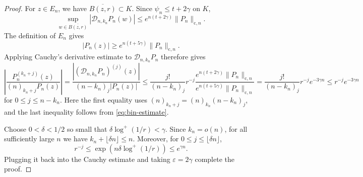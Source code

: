 \documentclass[10pt,reqno]{amsart}
\theoremstyle{remark}
\begin{document}
\begin{proof}
    For $z\in E_n$, we have $\overline{B(z,r)}\subset K$. Since $\psi_n\le t+2\gamma$ on $K$,
    \[\sup_{w\in\overline{B(z,r)}}|\mathcal D_{n,k_n}P_n(w)|
    \le e^{n(t+2\gamma)}\|P_n\|_{\mathrm{c},n}.\]
    The definition of $E_n$ gives
    \[|P_n(z)|\ge e^{n(t+5\gamma)}\|P_n\|_{\mathrm{c},n}.\]
    Applying Cauchy's derivative estimate to $\mathcal D_{n,k_n}P_n$ therefore gives
    \[\left|\frac{P_n^{(k_n+j)}(z)}{(n)_{k_n+j}P_n(z)}\right|
    = \frac{|(\mathcal D_{n,k_n}P_n)^{(j)}(z)|}{(n-k_n)_j|P_n(z)|}
    \le \frac{j!}{(n-k_n)_j}r^{-j}\frac{e^{n(t+2\gamma)}\|P_n\|_{\mathrm{c},n}}{e^{n(t+5\gamma)}\|P_n\|_{\mathrm{c},n}}
    = \frac{j!}{(n-k_n)_j}r^{-j}e^{-3\gamma n}
    \le r^{-j}e^{-3\gamma n}\]
    for $0\le j\le n-k_n$. Here the first equality uses $(n)_{k_n+j}=(n)_{k_n}(n-k_n)_j$, and the last inequality follows from \eqref{eq:bin-estimate}.
    
    Choose $0<\delta<1/2$ so small that $\delta\log^+(1/r)<\gamma$. Since $k_n=o(n)$, for all sufficiently large $n$ we have $k_n+\lfloor\delta n\rfloor\le n$. Moreover, for $0\le j\le\lfloor\delta n\rfloor$,
    \[r^{-j}\le\exp\left(n\delta\log^+(1/r)\right)\le e^{\gamma n}.\]
    Plugging it back into the Cauchy estimate and taking $\varepsilon=2\gamma$ complete the proof.
\end{proof}
\end{document}
